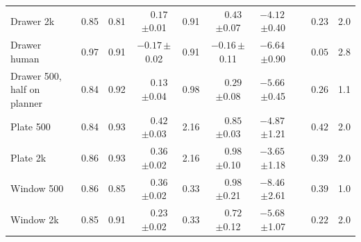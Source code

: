 \begin{table}[t]
\begin{tabular}{lcccccccc}
Drawer 2k & 0.85 & 0.81 & $\phantom{-}0.17$\,{\scriptsize$\pm$0.01} & 0.91 & $\phantom{-}0.43$\,{\scriptsize$\pm$0.07} & $-4.12$\,{\scriptsize$\pm$0.40} & $\phantom{-}0.23$ & 2.0 \\
Drawer human & 0.97 & 0.91 & $-0.17$\,{\scriptsize$\pm$0.02} & 0.91 & $-0.16$\,{\scriptsize$\pm$0.11} & $-6.64$\,{\scriptsize$\pm$0.90} & $\phantom{-}0.05$ & 2.8 \\
Drawer 500, half on planner & 0.84 & 0.92 & $\phantom{-}0.13$\,{\scriptsize$\pm$0.04} & 0.98 & $\phantom{-}0.29$\,{\scriptsize$\pm$0.08} & $-5.66$\,{\scriptsize$\pm$0.45} & $\phantom{-}0.26$ & 1.1 \\
Plate 500 & 0.84 & 0.93 & $\phantom{-}0.42$\,{\scriptsize$\pm$0.03} & 2.16 & $\phantom{-}0.85$\,{\scriptsize$\pm$0.03} & $-4.87$\,{\scriptsize$\pm$1.21} & $\phantom{-}0.42$ & 2.0 \\
Plate 2k & 0.86 & 0.93 & $\phantom{-}0.36$\,{\scriptsize$\pm$0.02} & 2.16 & $\phantom{-}0.98$\,{\scriptsize$\pm$0.10} & $-3.65$\,{\scriptsize$\pm$1.18} & $\phantom{-}0.39$ & 2.0 \\
Window 500 & 0.86 & 0.85 & $\phantom{-}0.36$\,{\scriptsize$\pm$0.02} & 0.33 & $\phantom{-}0.98$\,{\scriptsize$\pm$0.21} & $-8.46$\,{\scriptsize$\pm$2.61} & $\phantom{-}0.39$ & 1.0 \\
Window 2k & 0.85 & 0.91 & $\phantom{-}0.23$\,{\scriptsize$\pm$0.02} & 0.33 & $\phantom{-}0.72$\,{\scriptsize$\pm$0.12} & $-5.68$\,{\scriptsize$\pm$1.07} & $\phantom{-}0.22$ & 2.0 \\
\bottomrule
\end{tabular}
\end{table}

